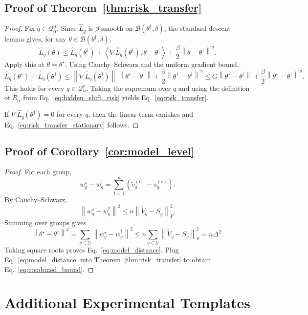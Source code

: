 \documentclass{article}
\newcommand{\cB}{\mathcal{B}}
\newcommand{\cG}{\mathcal{G}}
\newcommand{\cQ}{\mathcal{Q}}
\newcommand{\norm}[1]{\left\lVert #1 \right\rVert}
\newcommand{\paren}[1]{\left( #1 \right)}
\newcommand{\inner}[2]{\left\langle #1, #2 \right\rangle}
\begin{document}
\subsection{Proof of Theorem~\ref{thm:risk_transfer}}

\begin{proof}
Fix \(q\in\cQ_\alpha^n\). Since \(\widehat L_q\) is \(\beta\)-smooth on \(\cB(\theta^\dagger,\delta)\), the standard descent lemma gives, for any \(\theta\in\cB(\theta^\dagger,\delta)\),
\[
\widehat L_q(\theta)
\le
\widehat L_q(\theta^\dagger)
+
\inner{\nabla \widehat L_q(\theta^\dagger)}{\theta-\theta^\dagger}
+
\frac{\beta}{2}\norm{\theta-\theta^\dagger}^2.
\]
Apply this at \(\theta=\theta^\star\). Using Cauchy--Schwarz and the uniform gradient bound,
\[
\widehat L_q(\theta^\star) - \widehat L_q(\theta^\dagger)
\le
\norm{\nabla \widehat L_q(\theta^\dagger)}\,\norm{\theta^\star-\theta^\dagger}
+
\frac{\beta}{2}\norm{\theta^\star-\theta^\dagger}^2
\le
G\norm{\theta^\star-\theta^\dagger}
+
\frac{\beta}{2}\norm{\theta^\star-\theta^\dagger}^2.
\]
This holds for every \(q\in\cQ_\alpha^n\). Taking the supremum over \(q\) and using the definition of \(\widehat R_\alpha\) from Eq.~\eqref{eq:hidden_shift_risk} yields Eq.~\eqref{eq:risk_transfer}.

If \(\nabla \widehat L_q(\theta^\dagger)=0\) for every \(q\), then the linear term vanishes and Eq.~\eqref{eq:risk_transfer_stationary} follows.
\end{proof}

\subsection{Proof of Corollary~\ref{cor:model_level}}

\begin{proof}
For each group,
\[
w_g^\star - w_g^\dagger
=
\sum_{t=1}^{n}\paren{\widetilde v_g^{(t)} - s_g^{(t)}}.
\]
By Cauchy--Schwarz,
\[
\norm{w_g^\star - w_g^\dagger}^2
\le
n \norm{\widetilde V_g - S_g}_F^2.
\]
Summing over groups gives
\[
\norm{\theta^\star - \theta^\dagger}^2
=
\sum_{g\in\cG}\norm{w_g^\star - w_g^\dagger}^2
\le
n \sum_{g\in\cG}\norm{\widetilde V_g - S_g}_F^2
=
n \Delta^2.
\]
Taking square roots proves Eq.~\eqref{eq:model_distance}. Plug Eq.~\eqref{eq:model_distance} into Theorem~\ref{thm:risk_transfer} to obtain Eq.~\eqref{eq:combined_bound}.
\end{proof}

\section{Additional Experimental Templates}
\end{document}
